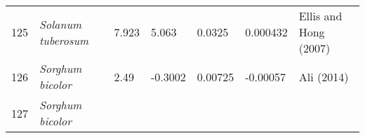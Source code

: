 \documentclass[]{article}
\begin{document}
\begin{longtable}[]{@{}lllllll@{}}
\begin{minipage}[t]{0.05\columnwidth}
125\strut
\end{minipage} & \begin{minipage}[t]{0.23\columnwidth}\raggedright
\emph{Solanum tuberosum}\strut
\end{minipage} & \begin{minipage}[t]{0.05\columnwidth}\raggedright
7.923\strut
\end{minipage} & \begin{minipage}[t]{0.08\columnwidth}\raggedright
5.063\strut
\end{minipage} & \begin{minipage}[t]{0.08\columnwidth}\raggedright
0.0325\strut
\end{minipage} & \begin{minipage}[t]{0.08\columnwidth}\raggedright
0.000432\strut
\end{minipage} & \begin{minipage}[t]{0.23\columnwidth}\raggedright
Ellis and Hong (2007)\strut
\end{minipage}\tabularnewline
\begin{minipage}[t]{0.05\columnwidth}\raggedright
126\strut
\end{minipage} & \begin{minipage}[t]{0.23\columnwidth}\raggedright
\emph{Sorghum bicolor}\strut
\end{minipage} & \begin{minipage}[t]{0.05\columnwidth}\raggedright
2.49\strut
\end{minipage} & \begin{minipage}[t]{0.08\columnwidth}\raggedright
-0.3002\strut
\end{minipage} & \begin{minipage}[t]{0.08\columnwidth}\raggedright
0.00725\strut
\end{minipage} & \begin{minipage}[t]{0.08\columnwidth}\raggedright
-0.00057\strut
\end{minipage} & \begin{minipage}[t]{0.23\columnwidth}\raggedright
Ali (2014)\strut
\end{minipage}\tabularnewline
\begin{minipage}[t]{0.05\columnwidth}\raggedright
127\strut
\end{minipage} & \begin{minipage}[t]{0.23\columnwidth}\raggedright
\emph{Sorghum bicolor}\strut
\end{minipage} & \begin{minipage}[t]{0.05\columnwidth}\raggedright

\end{minipage}
\end{longtable}
\end{document}
